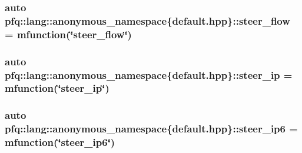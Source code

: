 \hypertarget{namespacepfq_1_1lang_1_1anonymous__namespace_02default_8hpp_03_adeb44c976ac903e7b13addb65ac41f9f}{
\subsubsection[{steer\+\_\+flow}]{\setlength{\rightskip}{0pt plus 5cm}auto pfq\+::lang\+::anonymous\+\_\+namespace\{default.\+hpp\}\+::steer\+\_\+flow = {\bf mfunction}(\char`\"{}steer\+\_\+flow\char`\"{})}}\label{namespacepfq_1_1lang_1_1anonymous__namespace_02default_8hpp_03_adeb44c976ac903e7b13addb65ac41f9f}
\hypertarget{namespacepfq_1_1lang_1_1anonymous__namespace_02default_8hpp_03_afe1c69c555a75021f7e637086cb1264c}{
\subsubsection[{steer\+\_\+ip}]{\setlength{\rightskip}{0pt plus 5cm}auto pfq\+::lang\+::anonymous\+\_\+namespace\{default.\+hpp\}\+::steer\+\_\+ip = {\bf mfunction}(\char`\"{}steer\+\_\+ip\char`\"{})}}\label{namespacepfq_1_1lang_1_1anonymous__namespace_02default_8hpp_03_afe1c69c555a75021f7e637086cb1264c}
\hypertarget{namespacepfq_1_1lang_1_1anonymous__namespace_02default_8hpp_03_a02291b124a4aa900d78797e386517f69}{
\subsubsection[{steer\+\_\+ip6}]{\setlength{\rightskip}{0pt plus 5cm}auto pfq\+::lang\+::anonymous\+\_\+namespace\{default.\+hpp\}\+::steer\+\_\+ip6 = {\bf mfunction}(\char`\"{}steer\+\_\+ip6\char`\"{})}}\label{namespacepfq_1_1lang_1_1anonymous__namespace_02default_8hpp_03_a02291b124a4aa900d78797e386517f69}

